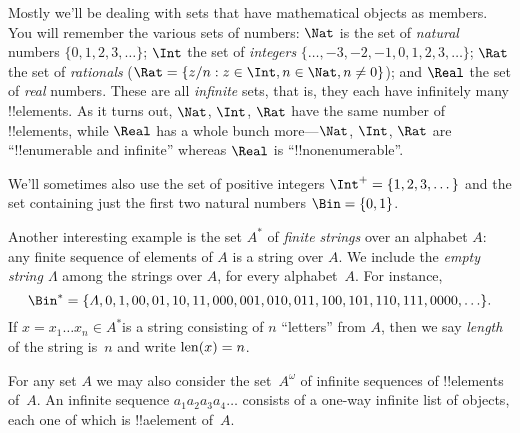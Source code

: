 \documentclass[../../include/open-logic-section]{subfiles}
\begin{document}

\begin{ex}
Mostly we'll be dealing with sets that have mathematical objects as
members. You will remember the various sets of numbers: $\Nat$
is the set of \emph{natural} numbers $\{0, 1, 2, 3, \dots\}$;
$\Int$ the set of \emph{integers} $\{\dots, -3, -2,
-1, 0, 1, 2, 3, \dots\}$; $\Rat$ the set of
\emph{rationals} ($\Rat = \Setabs{z/n}{z \in \Int, n \in \Nat, n \neq 0}$); and
$\Real$ the set of \emph{real} numbers. These are all \emph{infinite}
sets, that is, they each have infinitely many !!{element}s. As it turns
out, $\Nat$, $\Int$, $\Rat$ have the same number
of !!{element}s, while $\Real$ has a whole bunch more---$\Nat$,
$\Int$, $\Rat$ are ``!!{enumerable} and infinite'' whereas
$\Real$ is ``!!{nonenumerable}''.

We'll sometimes also use the set of positive integers $\Int^+ = \{1,
2, 3, \dots\}$ and the set containing just the first two natural
numbers $\Bin = \{0, 1\}$.
\end{ex}

\begin{ex}[Strings]
Another interesting example  is the set $A^{*}$ of
\emph{finite strings} over an alphabet $A$: any finite sequence of elements of
$A$ is a string over $A$. We include the \emph{empty string $\Lambda$}
among the strings over $A$, for every alphabet~$A$. For instance,
\[
\Bin^*
=\{\Lambda,0,1,00,01,10,11,000,001,010,011,100,101,110,111,0000,\ldots\}.
\]
If $x=x_{1}\ldots x_{n}\in A^{*}$is a string consisting of $n$
``letters'' from $A$, then we say \emph{length} of the string is~$n$
and write $\mathrm{len}(x)=n$.
\end{ex}

\begin{ex}
For any set $A$ we may also consider the set~$A^\omega$ of infinite
sequences of !!{element}s of~$A$. An infinite sequence
$a_1a_2a_3a_4\dots$ consists of a one-way infinite list of objects,
each one of which is !!a{element} of~$A$.
\end{ex}
\end{document}
